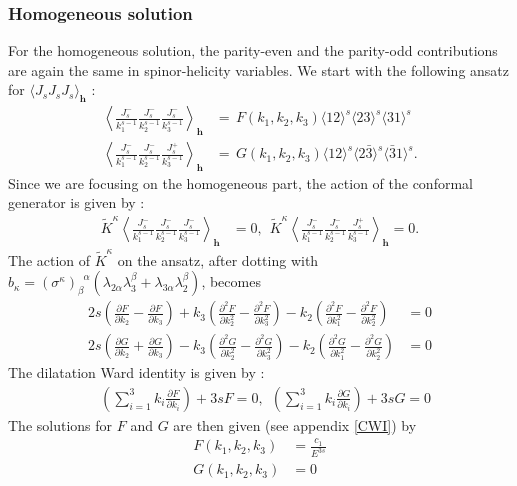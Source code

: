 \documentclass[a4paper,11pt]{article}
\begin{document}
\subsubsection*{Homogeneous solution}
For the homogeneous solution, the parity-even and the parity-odd contributions are again the same in spinor-helicity variables.
We start with the following ansatz for $\langle J_s J_s J_s \rangle_{\textbf{h}}$ :
\begin{align}\label{jsjsjsHH}
\left\langle \frac{J_s^-}{k^{s-1}_1}\frac{J_s^-}{k^{s-1}_2} \frac{J_s^-}{k^{s-1}_3} \right\rangle_{\textbf{h}} &=\,F(k_1,k _2, k_3)\langle 12 \rangle^s \langle 23 \rangle^s \langle 31 \rangle^s\\[6 pt]
\left\langle \frac{J_s^-}{k_1^{s-1}} \frac{J_s^-}{k_2^{s-1}} \frac{J_s^+}{k_3^{s-1}} \right\rangle_{\textbf{h}} &=\,G(k_1,k _2, k_3)\langle 12 \rangle^s \langle 2\bar{3} \rangle^s \langle \bar{3}1 \rangle^s.
\end{align}
Since we are focusing on the homogeneous part, the action of the conformal generator is given by :
\begin{align}\label{Kkappajsjsjs}
\widetilde{K}^{\kappa} \left\langle \frac{J_s^-}{k_1^{s-1}}\frac{J_s^-}{k_2^{s-1}} \frac{J_s^-}{k_3^{s-1}}  \right\rangle_{\textbf{h}} &=0 ,~~
\widetilde{K}^{\kappa} \left\langle \frac{J_s^-}{k_1^{s-1}} \frac{J_s^-}{k_2^{s-1}} \frac{J_s^+}{k_3^{s-1}} \right\rangle_{\textbf{h}} =0.
\end{align}
The action of $\widetilde{K}^{\kappa}$ on the ansatz, after dotting with $b_{\kappa}=(\sigma^{\kappa})_{\beta}^{\;\;\alpha}(\lambda_{2\alpha}\lambda^{\beta}_3+\lambda_{3\alpha}\lambda_2^{\beta})$, becomes 
\begin{align}
2s\left(\frac{\partial F}{\partial k_2}-\frac{\partial F}{\partial k_3}\right)+k_3\left(\frac{\partial^2 F}{\partial k_2^2}-\frac{\partial^2 F}{\partial k_3^2}\right)-k_2\left(\frac{\partial^2 F}{\partial k_1^2}-\frac{\partial^2 F}{\partial k_2^2}\right)&= 0\\[5 pt]
2s\left(\frac{\partial G}{\partial k_2}+\frac{\partial G}{\partial k_3}\right)-k_3\left(\frac{\partial^2 G}{\partial k_2^2}-\frac{\partial^2 G}{\partial k_3^2}\right)-k_2\left(\frac{\partial^2 G}{\partial k_1^2}-\frac{\partial^2 G}{\partial k_2^2}\right)&= 0
\end{align}
The dilatation Ward identity is given by :
\begin{align}
&\left(\sum_{i=1}^3 k_i \frac{\partial F}{\partial k_i}\right)+3sF=0,~~\left(\sum_{i=1}^3 k_i \frac{\partial G}{\partial k_i}\right)+3sG=0
\end{align}
The solutions for $F$ and $G$ are then given (see appendix \ref{CWI}) by
\begin{align}
\label{tttsh}
F(k_1, k_2, k_3) &= \frac{c_1}{E^{3s}}\\[5 pt]
G(k_1, k_2, k_3) &= 0
\end{align}
\end{document}
